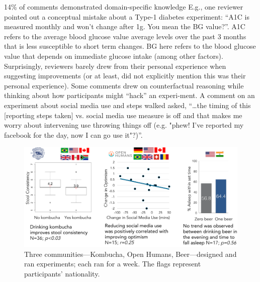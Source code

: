 14\% of comments demonstrated domain-specific knowledge E.g., one reviewer pointed out a conceptual mistake about a Type-1 diabetes experiment: “A1C is measured monthly and won't change after 1g. You mean the BG value?”. A1C refers to the average blood glucose value average levels over the past 3 months that is less susceptible to short term changes. BG here refers to the blood glucose value that depends on immediate glucose intake (among other factors). Surprisingly, reviewers barely drew from their personal experience when suggesting improvements (or at least, did not explicitly mention this was their personal experience). Some comments drew on counterfactual reasoning while thinking about how participants might “hack” an experi-ment. A comment on an experiment about social media use and steps walked asked, “…the timing of this [reporting steps taken] vs. social media use measure is off and that makes me worry about intervening use throwing things off (e.g. "phew! I've reported my facebook for the day, now I can go use it"?)”. 


\begin{figure}[h] 
\centering
  \includegraphics[width=1.0\textwidth]{figures/galileo/galileo-study3}
  \caption[Three communities—Kombucha, Open Humans, Beer—designed and ran experiments]
{Three communities—Kombucha, Open Humans, Beer—designed and ran experiments; each ran for a week. The flags represent participants’ nationality. }
  \label{fig:galileo-result3}
\end{figure}

